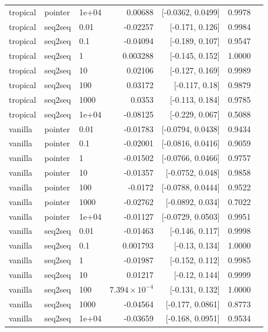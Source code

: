 \documentclass[10pt]{article}
\begin{document}
{\begin{longtable}{lllrrrl}
tropical & pointer & 1e+04 & 0.00688 & [-0.0362, 0.0499] & 0.9978 & \\
tropical & seq2seq & 0.01 & -0.02257 & [-0.171, 0.126] & 0.9984 & \\
tropical & seq2seq & 0.1 & -0.04094 & [-0.189, 0.107] & 0.9547 & \\
tropical & seq2seq & 1 & 0.003288 & [-0.145, 0.152] & 1.0000 & \\
tropical & seq2seq & 10 & 0.02106 & [-0.127, 0.169] & 0.9989 & \\
tropical & seq2seq & 100 & 0.03172 & [-0.117, 0.18] & 0.9879 & \\
tropical & seq2seq & 1000 & 0.0353 & [-0.113, 0.184] & 0.9785 & \\
tropical & seq2seq & 1e+04 & -0.08125 & [-0.229, 0.067] & 0.5088 & \\
vanilla & pointer & 0.01 & -0.01783 & [-0.0794, 0.0438] & 0.9434 & \\
vanilla & pointer & 0.1 & -0.02001 & [-0.0816, 0.0416] & 0.9059 & \\
vanilla & pointer & 1 & -0.01502 & [-0.0766, 0.0466] & 0.9757 & \\
vanilla & pointer & 10 & -0.01357 & [-0.0752, 0.048] & 0.9858 & \\
vanilla & pointer & 100 & -0.0172 & [-0.0788, 0.0444] & 0.9522 & \\
vanilla & pointer & 1000 & -0.02762 & [-0.0892, 0.034] & 0.7022 & \\
vanilla & pointer & 1e+04 & -0.01127 & [-0.0729, 0.0503] & 0.9951 & \\
vanilla & seq2seq & 0.01 & -0.01463 & [-0.146, 0.117] & 0.9998 & \\
vanilla & seq2seq & 0.1 & 0.001793 & [-0.13, 0.134] & 1.0000 & \\
vanilla & seq2seq & 1 & -0.01987 & [-0.152, 0.112] & 0.9985 & \\
vanilla & seq2seq & 10 & 0.01217 & [-0.12, 0.144] & 0.9999 & \\
vanilla & seq2seq & 100 & $7.394\times10^{-4}$ & [-0.131, 0.132] & 1.0000 & \\
vanilla & seq2seq & 1000 & -0.04564 & [-0.177, 0.0861] & 0.8773 & \\
vanilla & seq2seq & 1e+04 & -0.03659 & [-0.168, 0.0951] & 0.9534 & \\
\bottomrule
\end{longtable}
}
\end{document}
